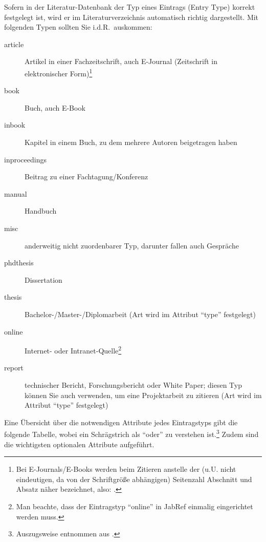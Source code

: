 Sofern in der Literatur-Datenbank der Typ eines Eintrags (Entry Type) korrekt festgelegt ist, wird er im Literaturverzeichnis automatisch richtig dargestellt. Mit folgenden Typen sollten Sie i.d.R.\ auskommen:
\begin{description}
\item[article] Artikel in einer Fachzeitschrift, auch E-Journal (Zeitschrift in elektronischer Form)\footnote{Bei E-Journals/E-Books werden beim Zitieren anstelle der (u.U. nicht eindeutigen, da von der Schriftgröße abhängigen) Seitenzahl Abschnitt und Absatz näher bezeichnet, also: \cite[Abschnitt 1.2.3, Absatz 4]{Staab}.}
\item[book] Buch, auch E-Book 
\item[inbook] Kapitel in einem Buch, zu dem mehrere Autoren beigetragen haben 
\item[inproceedings] Beitrag zu einer Fachtagung/Konferenz 
\item[manual] Handbuch
\item[misc] anderweitig nicht zuordenbarer Typ, darunter fallen auch Gespräche
\item[phdthesis] Dissertation
\item[thesis] Bachelor-/Master-/Diplomarbeit (Art wird im Attribut \enquote{type} festgelegt) 
\item[online] Internet- oder Intranet-Quelle\footnote{\label{fn:onlineEntryType}Man beachte, dass der Eintragstyp \enquote{online} in JabRef einmalig eingerichtet werden muss.}
\item[report] technischer Bericht, Forschungsbericht oder White Paper; diesen Typ können Sie auch verwenden, um eine Projektarbeit zu zitieren (Art wird im Attribut \enquote{type} festgelegt) 
\end{description} 

Eine Übersicht über die notwendigen Attribute jedes Eintragstyps gibt die folgende Tabelle, wobei ein Schrägstrich als \enquote{oder} zu verstehen ist.\footnote{Auszugsweise entnommen aus \cite{biblatex:manual}.} Zudem sind die wichtigsten optionalen Attribute aufgeführt.

